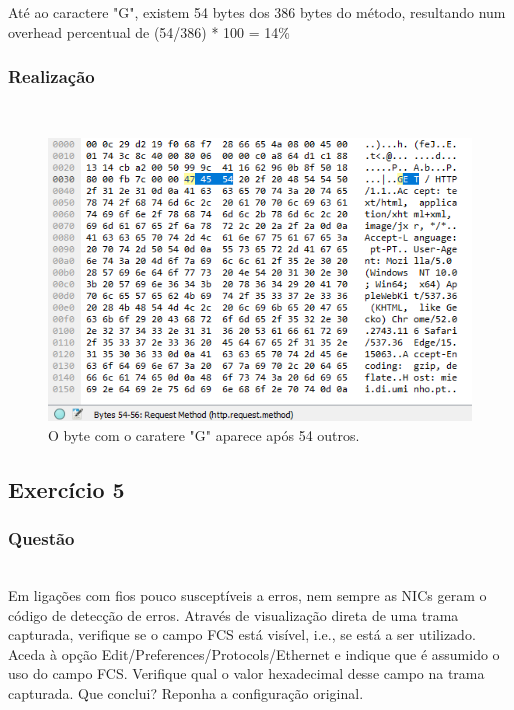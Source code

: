 \documentclass{llncs}
\begin{document}
Até ao caractere "G", existem 54 bytes dos 386 bytes do método, resultando num overhead percentual de (54/386) * 100 = 14\%

\subsubsection{Realização}\rule[-10pt]{0pt}{10pt}\\

\begin{figure}
  \begin{center}
  \includegraphics[scale=0.35]{imagens/HTTPbytes.png} 
  \end{center}
  \caption{O byte com o caratere "G" aparece após 54 outros.}
  \label{fig:http_bytes}
\end{figure} 

\clearpage
\subsection{Exercício 5}
\subsubsection{Questão}\rule[-10pt]{0pt}{10pt}\\

Em ligações com fios pouco susceptíveis a erros, nem sempre as NICs geram o código de detecção de erros. Através de visualização direta de uma trama capturada, verifique se o campo FCS está visível, i.e., se está a ser utilizado. Aceda à opção Edit/Preferences/Protocols/Ethernet e indique que é assumido o uso do campo FCS. Verifique qual o valor hexadecimal desse campo na trama
capturada. Que conclui? Reponha a configuração original.
\end{document}
